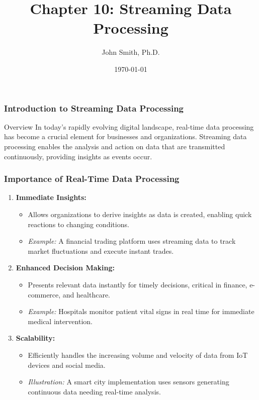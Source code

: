 \documentclass[aspectratio=169]{beamer}
\title[Chapter 10: Streaming Data Processing]{Chapter 10: Streaming Data Processing}
\author[J. Smith]{John Smith, Ph.D.}
\institute[University Name]{
  Department of Computer Science\\
  University Name\\
  \vspace{0.3cm}
  Email: email@university.edu\\
  Website: www.university.edu
}
\date{\today}
\begin{document}
\frame{\titlepage}

\begin{frame}[fragile]
    \frametitle{Introduction to Streaming Data Processing}
    \begin{block}{Overview}
        In today's rapidly evolving digital landscape, real-time data processing has become a crucial element for businesses and organizations. Streaming data processing enables the analysis and action on data that are transmitted continuously, providing insights as events occur. 
    \end{block}
\end{frame}

\begin{frame}[fragile]
    \frametitle{Importance of Real-Time Data Processing}
    \begin{enumerate}
        \item \textbf{Immediate Insights:}
        \begin{itemize}
            \item Allows organizations to derive insights as data is created, enabling quick reactions to changing conditions.
            \item \textit{Example:} A financial trading platform uses streaming data to track market fluctuations and execute instant trades.
        \end{itemize}
        
        \item \textbf{Enhanced Decision Making:}
        \begin{itemize}
            \item Presents relevant data instantly for timely decisions, critical in finance, e-commerce, and healthcare.
            \item \textit{Example:} Hospitals monitor patient vital signs in real time for immediate medical intervention.
        \end{itemize}
        
        \item \textbf{Scalability:}
        \begin{itemize}
            \item Efficiently handles the increasing volume and velocity of data from IoT devices and social media.
            \item \textit{Illustration:} A smart city implementation uses sensors generating continuous data needing real-time analysis.
        \end{itemize}
    \end{enumerate}
\end{frame}
\end{document}
